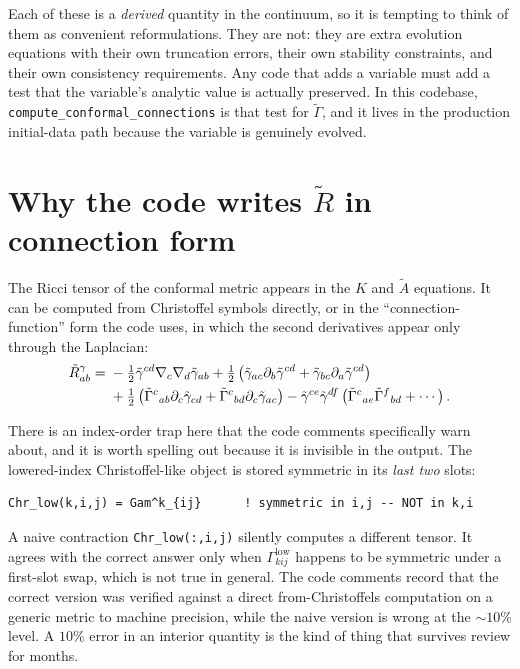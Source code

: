 \documentclass[11pt,openany]{book}
\newcommand{\At}{\tilde{A}}
\newcommand{\Gt}{\tilde{\Gamma}}
\newcommand{\etr}{\tilde{\gamma}}
\begin{document}
\gotcha
Each of these is a \emph{derived} quantity in the continuum, so it is tempting
to think of them as convenient reformulations. They are not: they are extra
evolution equations with their own truncation errors, their own stability
constraints, and their own consistency requirements. Any code that adds a
variable must add a test that the variable's analytic value is actually
preserved. In this codebase, \texttt{compute\_conformal\_connections} is that
test for $\Gt$, and it lives in the production initial-data path because the
variable is genuinely evolved.

\section{Why the code writes $\tilde{R}$ in connection form}

The Ricci tensor of the conformal metric appears in the $K$ and $\At$
equations. It can be computed from Christoffel symbols directly, or in the
``connection-function'' form the code uses, in which the second derivatives
appear only through the Laplacian:
\begin{align}
\tilde{R}^\gamma_{ab} = \;& -\tfrac{1}{2}\etr^{cd}\nabla_c\nabla_d\etr_{ab}
  + \tfrac{1}{2}\left(\etr_{ac}\partial_b\etr^{cd}
      + \etr_{bc}\partial_a\etr^{cd}\right) \notag\\
  & + \tfrac{1}{2}\left(\Gt^c{}_{ab}\partial_c\etr_{cd}
      + \Gt^c{}_{bd}\partial_c\etr_{ac}\right)
  - \etr^{ce}\etr^{df}\left(\Gt^c{}_{ae}\Gt^f{}_{bd}
      + \cdots\right).
\end{align}

\gotcha
There is an index-order trap here that the code comments specifically warn
about, and it is worth spelling out because it is invisible in the output.
The lowered-index Christoffel-like object is stored symmetric in its
\emph{last two} slots:
\begin{lstlisting}
Chr_low(k,i,j) = Gam^k_{ij}      ! symmetric in i,j -- NOT in k,i
\end{lstlisting}
A naive contraction \texttt{Chr\_low(:,i,j)} silently computes a different
tensor. It agrees with the correct answer only when $\Gamma^{\mathrm{low}}_{kij}$ happens to be
symmetric under a first-slot swap, which is not true in general. The code
comments record that the correct version was verified against a direct
from-Christoffels computation on a generic metric to machine precision, while
the naive version is wrong at the $\sim 10\%$ level. A $10\%$ error in an
interior quantity is the kind of thing that survives review for months.
\end{document}
